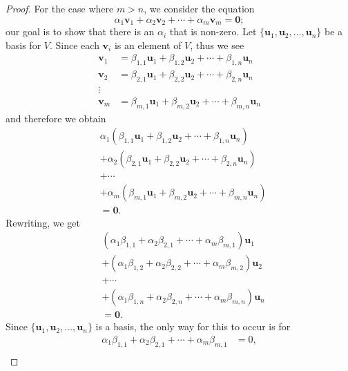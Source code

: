 \begin{proof}
    For the case where $m > n$, we consider the equation
    \[
        \alpha_1\textbf{v}_1 + \alpha_2\textbf{v}_2 + \cdots + \alpha_m\textbf{v}_m = \textbf{0};
    \]
    our goal is to show that there is an $\alpha_i$ that is non-zero. Let $\{\textbf{u}_1, \textbf{u}_2, \dots, \textbf{u}_n\}$ be a basis for $V$. Since each $\textbf{v}_i$ is an element of $V$, thus we see
    \begin{align*}
        \textbf{v}_1 &= \beta_{1,1}\textbf{u}_1 + \beta_{1,2}\textbf{u}_2 + \cdots + \beta_{1,n}\textbf{u}_n\\
        \textbf{v}_2 &= \beta_{2,1}\textbf{u}_1 + \beta_{2,2}\textbf{u}_2 + \cdots + \beta_{2,n}\textbf{u}_n\\
        \vdots\\
        \textbf{v}_m &= \beta_{m,1}\textbf{u}_1 + \beta_{m,2}\textbf{u}_2 + \cdots + \beta_{m,n}\textbf{u}_n
    \end{align*}
    and therefore we obtain
    \begin{align*}
        &\alpha_1\left(\beta_{1,1}\textbf{u}_1 + \beta_{1,2}\textbf{u}_2 + \cdots + \beta_{1,n}\textbf{u}_n\right)\\
        &+ \alpha_2\left(\beta_{2,1}\textbf{u}_1 + \beta_{2,2}\textbf{u}_2 + \cdots + \beta_{2,n}\textbf{u}_n\right)\\
        &+ \cdots \\
        &+ \alpha_m\left(\beta_{m,1}\textbf{u}_1 + \beta_{m,2}\textbf{u}_2 + \cdots + \beta_{m,n}\textbf{u}_n\right)\\
        &= \textbf{0}.
    \end{align*}
    Rewriting, we get
    \begin{align*}
        &\left(\alpha_1\beta_{1,1} + \alpha_2\beta_{2,1} + \cdots + \alpha_m\beta_{m,1}\right)\textbf{u}_1\\
        &+ \left(\alpha_1\beta_{1,2} + \alpha_2\beta_{2,2} + \cdots + \alpha_m\beta_{m,2}\right)\textbf{u}_2\\
        &+ \cdots\\
        &+ \left(\alpha_1\beta_{1,n} + \alpha_2\beta_{2,n} + \cdots + \alpha_m\beta_{m,n}\right)\textbf{u}_n\\
        &= \textbf{0}.
    \end{align*}
    Since $\{\textbf{u}_1, \textbf{u}_2, \dots, \textbf{u}_n\}$ is a basis, the only way for this to occur is for
    \begin{align*}
        \alpha_1\beta_{1,1} + \alpha_2\beta_{2,1} + \cdots + \alpha_m\beta_{m,1} &= 0,\\

\end{align*}
\end{proof}
